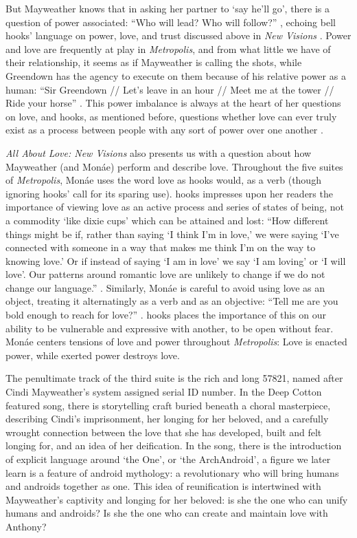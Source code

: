 \documentclass[a4paper, 11pt]{article} %
\begin{document}
But Mayweather knows that in asking her partner to `say he'll go', there is a question of power associated: ``Who will lead? Who will follow?''
 , echoing bell hooks' language on power, love, and trust discussed above in \emph{New Visions} .
Power and love are frequently at play in \emph{Metropolis}, and from what little we have of their relationship, it seems as if Mayweather is calling the shots, while Greendown has the agency to execute on them because of his relative power as a human: ``Sir Greendown // Let's leave in an hour // Meet me at the tower // Ride your horse'' .
This power imbalance is always at the heart of her questions on love, and hooks, as mentioned before, questions whether love can ever truly exist as a process between people with any sort of power over one another .

\emph{All About Love: New Visions} also presents us with a question about how Mayweather (and Mon\'ae) perform and describe love.
Throughout the five suites of \emph{Metropolis}, Mon\'ae uses the word love as hooks would, as a verb (though ignoring hooks' call for its sparing use).
hooks impresses upon her readers the importance of viewing love as an active process and series of states of being, not a commodity `like dixie cups' which can be attained and lost:
``How different things might be if, rather than saying `I think I'm in love,' we were saying `I've connected with someone in a way that makes me think I'm on the way to knowing love.' Or if instead of saying `I am in love' we say `I am loving' or `I will love'. Our patterns around romantic love are unlikely to change if we do not change our language.'' .
Similarly, Mon\'ae is careful to avoid using love as an object, treating it alternatingly as a verb and as an objective: ``Tell me are you bold enough to reach for love?'' .
hooks places the importance of this on our ability to be vulnerable and expressive with another, to be open without fear.
Mon\'ae centers tensions of love and power throughout \emph{Metropolis}: Love is enacted power, while exerted power destroys love.

The penultimate track of the third suite is the rich and long 57821, named after Cindi Mayweather's system assigned serial ID number.
In the Deep Cotton featured song, there is storytelling craft buried beneath a choral masterpiece, describing Cindi's imprisonment, her longing for her beloved, and a carefully wrought connection between the love that she has developed, built and felt longing for, and an idea of her deification.
In the song, there is the introduction of explicit language around `the One', or `the ArchAndroid', a figure we later learn is a feature of android mythology: a revolutionary who will bring humans and androids together as one.
This idea of reunification is intertwined with Mayweather's captivity and longing for her beloved: is she the one who can unify humans and androids? Is she the one who can create and maintain love with Anthony?
\end{document}
